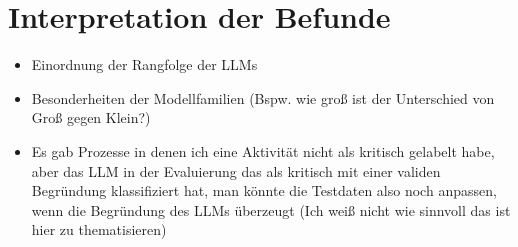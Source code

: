 \section{Interpretation der Befunde}\label{sec:interpretation-der-befunde}

\begin{itemize}
    \item Einordnung der Rangfolge der LLMs
    \item Besonderheiten der Modellfamilien (Bspw. wie groß ist der Unterschied von Groß gegen Klein?)
    \item Es gab Prozesse in denen ich eine Aktivität nicht als kritisch gelabelt habe, aber das LLM in der Evaluierung das als kritisch mit einer validen Begründung klassifiziert hat, man könnte die Testdaten also noch anpassen, wenn die Begründung des LLMs überzeugt (Ich weiß nicht wie sinnvoll das ist hier zu thematisieren)
\end{itemize}